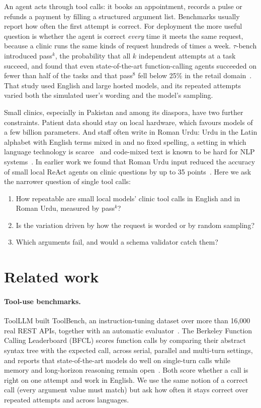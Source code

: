 \documentclass[11pt,a4paper]{article}
\newcommand{\passk}[1]{pass$^{#1}$}
\begin{document}
An agent acts through tool calls: it books an appointment, records a pulse or refunds a payment by filling a
structured argument list. Benchmarks usually report how often the first attempt is correct. For deployment the more
useful question is whether the agent is correct \emph{every} time it meets the same request, because a clinic runs
the same kinds of request hundreds of times a week. $\tau$-bench introduced \passk{k}, the probability that all $k$
independent attempts at a task succeed, and found that even state-of-the-art function-calling agents succeeded on fewer than half of
the tasks and that \passk{8} fell below 25\% in the retail domain~\cite{yao2024tau}. That study used English and large hosted models, and its
repeated attempts varied both the simulated user's wording and the model's sampling.

Small clinics, especially in Pakistan and among its diaspora, have two further constraints. Patient data should stay
on local hardware, which favours models of a few billion parameters. And staff often write in Roman Urdu: Urdu in
the Latin alphabet with English terms mixed in and no fixed spelling, a setting in which language technology is
scarce~\cite{butt2025romanir,butt2025transliteration} and code-mixed text is known to be hard for NLP
systems~\cite{khanuja2020gluecos}. In earlier work we found that Roman Urdu input reduced the accuracy of small local
ReAct agents on clinic questions by up to 35 points~\cite{hussain2026romanurdu}. Here we ask the narrower question
of single tool calls:

\begin{enumerate}
  \item How repeatable are small local models' clinic tool calls in English and in Roman Urdu, measured by
  \passk{k}?
  \item Is the variation driven by how the request is worded or by random sampling?
  \item Which arguments fail, and would a schema validator catch them?
\end{enumerate}

\section{Related work}

\paragraph{Tool-use benchmarks.} ToolLLM built ToolBench, an instruction-tuning dataset over more than 16,000 real REST
APIs, together with an automatic evaluator~\cite{qin2024toolllm}. The Berkeley Function Calling Leaderboard (BFCL)
scores function calls by comparing their abstract syntax tree with the expected call, across serial, parallel and
multi-turn settings, and reports that state-of-the-art models do well on single-turn calls while memory and long-horizon
reasoning remain open~\cite{patil2025bfcl}. Both score whether a call is right on one attempt and work in English. We
use the same notion of a correct call (every argument value must match) but ask how often it stays correct over repeated
attempts and across languages.
\end{document}
